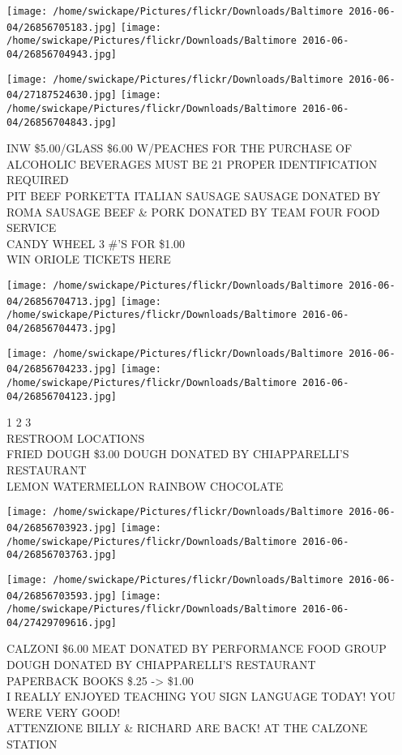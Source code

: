 \documentclass[10pt,letterpaper]{article}
\begin{document}
\texttt{[image: /home/swickape/Pictures/flickr/Downloads/Baltimore 2016-06-04/26856705183.jpg]}
\texttt{[image: /home/swickape/Pictures/flickr/Downloads/Baltimore 2016-06-04/26856704943.jpg]}

\texttt{[image: /home/swickape/Pictures/flickr/Downloads/Baltimore 2016-06-04/27187524630.jpg]}
\texttt{[image: /home/swickape/Pictures/flickr/Downloads/Baltimore 2016-06-04/26856704843.jpg]}

INW \$5.00/GLASS \$6.00 W/PEACHES FOR THE PURCHASE OF ALCOHOLIC BEVERAGES MUST BE 21 PROPER IDENTIFICATION REQUIRED\\
PIT BEEF PORKETTA ITALIAN SAUSAGE SAUSAGE DONATED BY ROMA SAUSAGE BEEF \& PORK DONATED BY TEAM FOUR FOOD SERVICE\\
CANDY WHEEL 3 \#'S FOR \$1.00\\
WIN ORIOLE TICKETS HERE
\pagebreak

\texttt{[image: /home/swickape/Pictures/flickr/Downloads/Baltimore 2016-06-04/26856704713.jpg]}
\texttt{[image: /home/swickape/Pictures/flickr/Downloads/Baltimore 2016-06-04/26856704473.jpg]}

\texttt{[image: /home/swickape/Pictures/flickr/Downloads/Baltimore 2016-06-04/26856704233.jpg]}
\texttt{[image: /home/swickape/Pictures/flickr/Downloads/Baltimore 2016-06-04/26856704123.jpg]}

1 2 3\\
RESTROOM LOCATIONS\\
FRIED DOUGH \$3.00 DOUGH DONATED BY CHIAPPARELLI'S RESTAURANT\\
LEMON WATERMELLON RAINBOW CHOCOLATE
\pagebreak

\texttt{[image: /home/swickape/Pictures/flickr/Downloads/Baltimore 2016-06-04/26856703923.jpg]}
\texttt{[image: /home/swickape/Pictures/flickr/Downloads/Baltimore 2016-06-04/26856703763.jpg]}

\texttt{[image: /home/swickape/Pictures/flickr/Downloads/Baltimore 2016-06-04/26856703593.jpg]}
\texttt{[image: /home/swickape/Pictures/flickr/Downloads/Baltimore 2016-06-04/27429709616.jpg]}

CALZONI \$6.00 MEAT DONATED BY PERFORMANCE FOOD GROUP DOUGH DONATED BY CHIAPPARELLI'S RESTAURANT\\
PAPERBACK BOOKS \$.25 {-}> \$1.00\\
I REALLY ENJOYED TEACHING YOU SIGN LANGUAGE TODAY!  YOU WERE VERY GOOD!\\
ATTENZIONE BILLY \& RICHARD ARE BACK! AT THE CALZONE STATION
\pagebreak
\end{document}
